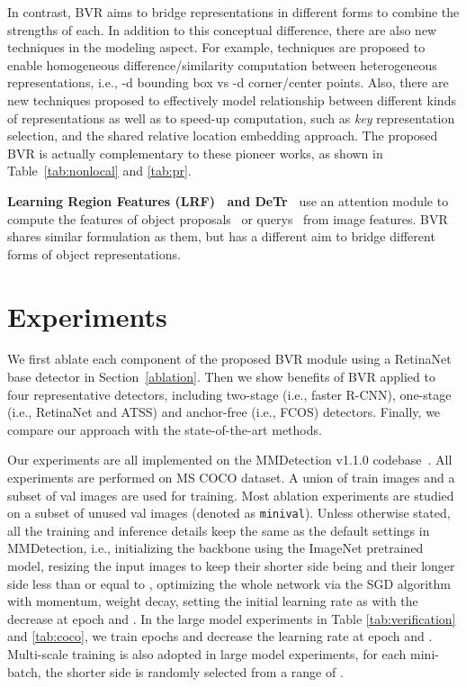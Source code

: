 \documentclass{article}
\def\ie{{i.e.}}
\begin{document}
In contrast, BVR aims to bridge representations in different forms to combine the strengths of each. In addition to this conceptual difference, there are also new techniques in the modeling aspect. For example, techniques are proposed to enable homogeneous difference/similarity computation between heterogeneous representations, \ie, -d bounding box vs -d corner/center points. Also, there are new techniques proposed to effectively model relationship between different kinds of representations as well as to speed-up computation, such as \emph{key} representation selection, and the shared relative location embedding approach. The proposed BVR is actually complementary to these pioneer works, as shown in Table~\ref{tab:nonlocal} and \ref{tab:pr}.

{\noindent \textbf{Learning Region Features (LRF)~\cite{gu2018learning} and DeTr~\cite{carion2020endtoend}}} use an attention module to compute the features of object proposals~\cite{gu2018learning} or querys~\cite{carion2020endtoend} from image features. BVR shares similar formulation as them, but has a different aim to bridge different forms of object representations. 
\vspace{-.5em}

\section{Experiments}

We first ablate each component of the proposed BVR module using a RetinaNet base detector in Section~\ref{ablation}. Then we show benefits of BVR applied to four representative detectors, including two-stage (i.e., faster R-CNN), one-stage (i.e., RetinaNet and ATSS) and anchor-free (i.e., FCOS) detectors. Finally, we compare our approach with the state-of-the-art methods. 

Our experiments are all implemented on the MMDetection v1.1.0 codebase~\cite{mmdetection}. All experiments are performed on MS COCO dataset\cite{MSCOCO}. A union of  train images and a  subset of val images are used for training. Most ablation experiments are studied on a subset of  unused val images (denoted as {\tt minival}). Unless otherwise stated, all the training and inference details keep the same as the default settings in MMDetection, i.e., initializing the backbone using the ImageNet \cite{DBLP:journals/ijcv/RussakovskyDSKS15} pretrained model, resizing the input images to keep their shorter side being  and their longer side less than or equal to , optimizing the whole network via the SGD algorithm with  momentum,  weight decay, setting the initial learning rate as  with the  decrease at epoch  and . In the large model experiments in Table \ref{tab:verification} and \ref{tab:coco}, we train  epochs and decrease the learning rate at epoch  and . Multi-scale training is also adopted in large model experiments, for each mini-batch, the shorter side is randomly selected from a range of . 
\end{document}
